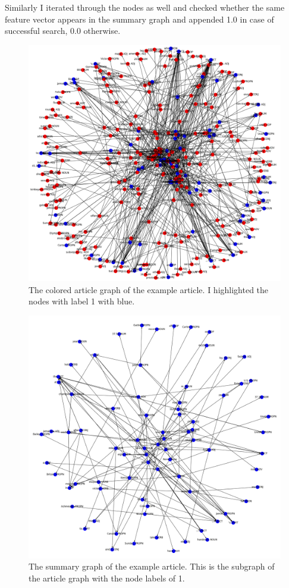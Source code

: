 Similarly I iterated through the nodes as well and checked whether the same feature vector appears in the summary graph and appended 1.0 in case of successful search, 0.0 otherwise.

\begin{figure}[!ht]
	\centering
	\includegraphics[width=150mm, keepaspectratio]{figures/usain_bolt_colored.png}
	\caption{The colored article graph of the example article. I highlighted the nodes with label 1 with blue.}
	\label{fig:usain_article_graph_colored}
\end{figure}

\begin{figure}[!ht]
	\centering
	\includegraphics[width=150mm, keepaspectratio]{figures/usain_bolt_summary.png}
	\caption{The summary graph of the example article. This is the subgraph of the article graph with the node labels of 1.}
	\label{fig:usain_summary_graph}
\end{figure}

